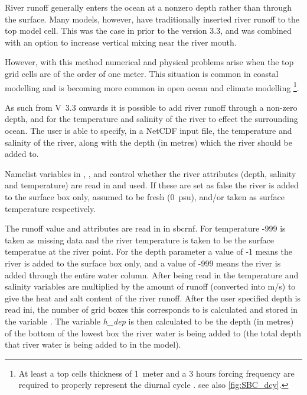 \documentclass[../main/NEMO_manual]{subfiles}
\begin{document}


River runoff generally enters the ocean at a nonzero depth rather than through the surface.
Many models, however, have traditionally inserted river runoff to the top model cell.
This was the case in \NEMO prior to the version 3.3,
and was combined with an option to increase vertical mixing near the river mouth.

However, with this method numerical and physical problems arise when the top grid cells are of the order of one meter.
This situation is common in coastal modelling and is becoming more common in open ocean and climate modelling 
\footnote{
  At least a top cells thickness of 1~meter and a 3 hours forcing frequency are required to
  properly represent the diurnal cycle \citep{Bernie_al_JC05}.
  see also \autoref{fig:SBC_dcy}.}.

As such from V~3.3 onwards it is possible to add river runoff through a non-zero depth,
and for the temperature and salinity of the river to effect the surrounding ocean.
The user is able to specify, in a NetCDF input file, the temperature and salinity of the river,
along with the depth (in metres) which the river should be added to.

Namelist variables in , ,  and
 control whether the river attributes (depth, salinity and temperature) are read in and used.
If these are set as false the river is added to the surface box only, assumed to be fresh (0~psu),
and/or taken as surface temperature respectively.

The runoff value and attributes are read in in sbcrnf.  
For temperature -999 is taken as missing data and the river temperature is taken to
be the surface temperatue at the river point.
For the depth parameter a value of -1 means the river is added to the surface box only, 
and a value of -999 means the river is added through the entire water column. 
After being read in the temperature and salinity variables are multiplied by the amount of runoff
(converted into m/s) to give the heat and salt content of the river runoff.
After the user specified depth is read ini,
the number of grid boxes this corresponds to is calculated and stored in the variable .
The variable \textit{h\_dep} is then calculated to be the depth (in metres) of
the bottom of the lowest box the river water is being added to
(\ie the total depth that river water is being added to in the model).
\end{document}

